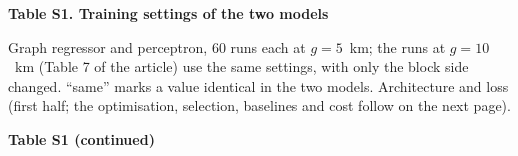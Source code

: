 \documentclass[10pt,a4paper]{article}
\begin{document}
{\large\bfseries Table S1. Training settings of the two models}

\medskip
\small
Graph regressor and perceptron, 60 runs each at $g = 5$~km; the runs at $g = 10$~km (Table 7 of the article) use the same settings, with only the block side changed. ``same'' marks a value identical in the two models.
Architecture and loss (first half; the optimisation, selection, baselines and cost follow on the next page).

\medskip


\clearpage
{\large\bfseries Table S1 (continued)}

\medskip
\small

\end{document}
